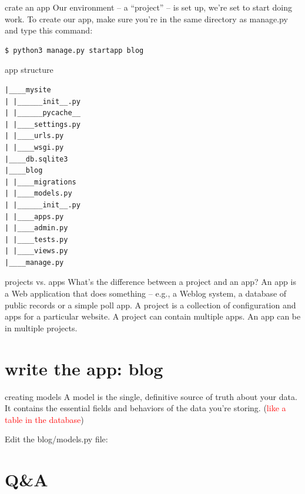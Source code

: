 \documentclass{beamer}
\begin{document}
\begin{frame}[fragile]{crate an app}
Our environment – a “project” – is set up, we’re set to start doing work.
To create our app, make sure you’re in the same directory as manage.py and type this command:
\begin{verbatim}
$ python3 manage.py startapp blog
\end{verbatim}
\end{frame}
\begin{frame}[fragile]{app structure}
\begin{verbatim}
|____mysite
| |______init__.py
| |______pycache__
| |____settings.py
| |____urls.py
| |____wsgi.py
|____db.sqlite3
|____blog
| |____migrations
| |____models.py
| |______init__.py
| |____apps.py
| |____admin.py
| |____tests.py
| |____views.py
|____manage.py
\end{verbatim}
\end{frame}
\begin{frame}{projects vs. apps}
What’s the difference between a project and an app? An app is a Web application that does something – e.g., a Weblog system, a database of public records or a simple poll app. A project is a collection of configuration and apps for a particular website. A project can contain multiple apps. An app can be in multiple projects.
\end{frame}
\section{write the app: blog}
\begin{frame}{creating models}
A model is the single, definitive source of truth about your data. It contains the essential fields and behaviors of the data you’re storing. (\textcolor{red}{like a table in the database})

Edit the blog/models.py file:
\end{frame}
\section{Q\&A}
\begin{frame}
\end{frame}

%
\end{document}
